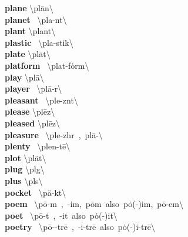 \documentclass[10pt,a4paper]{article}
\begin{document}
\begin{multicols}{2}
\textbf{ plane }\quad \textbackslash \textprimstress pl\={a}n\textbackslash \\
\textbf{ planet }\quad \ \textbackslash \textprimstress pla-n\textschwa t\textbackslash \\
\textbf{ plant }\quad \textbackslash \textprimstress plant\textbackslash \\
\textbf{ plastic }\quad \ \textbackslash \textprimstress pla-stik\textbackslash \\
\textbf{ plate }\quad \textbackslash \textprimstress pl\={a}t\textbackslash \\
\textbf{ platform }\quad \ \textbackslash \textprimstress plat-\textsecstress f\.{o}rm\textbackslash \\
\textbf{ play }\quad \textbackslash \textprimstress pl\={a}\textbackslash \\
\textbf{ player }\quad \ \textbackslash \textprimstress pl\={a}-\textschwa r\textbackslash \\
\textbf{ pleasant }\quad \ \textbackslash \textprimstress ple-z\textsuperscript{\textreve}nt\textbackslash \\
\textbf{ please }\quad \textbackslash \textprimstress pl\={e}z\textbackslash \\
\textbf{ pleased }\quad \textbackslash \textprimstress pl\={e}z\textbackslash \\
\textbf{ pleasure }\quad \ \textbackslash \textprimstress ple-zh\textschwa r\ ,\ \textprimstress pl\={a}-\textbackslash \\
\textbf{ plenty }\quad \ \textbackslash \textprimstress plen-t\={e}\textbackslash \\
\textbf{ plot }\quad \textbackslash \textprimstress pl\"{a}t\textbackslash \\
\textbf{ plug }\quad \textbackslash \textprimstress pl\textschwa g\textbackslash \\
\textbf{ plus }\quad \textbackslash \textprimstress pl\textschwa s\textbackslash \\
\textbf{ pocket }\quad \ \textbackslash \textprimstress p\"{a}-k\textschwa t\textbackslash \\
\textbf{ poem }\quad \ \textbackslash \textprimstress p\={o}-\textschwa m\ ,\ -im,\ \textprimstress p\={o}m\ also\ \textprimstress p\.{o}(-)im,\ \textprimstress p\={o}-\textsecstress em\textbackslash \\
\textbf{ poet }\quad \ \textbackslash \textprimstress p\={o}-\textschwa t\ ,\ -it\ also\ \textprimstress p\.{o}(-)it\textbackslash \\
\textbf{ poetry }\quad \ \textbackslash \textprimstress p\={o}-\textschwa -tr\={e}\ ,\ -i-tr\={e}\ also\ \textprimstress p\.{o}(-)i-tr\={e}\textbackslash \\

\end{multicols}
\end{document}
